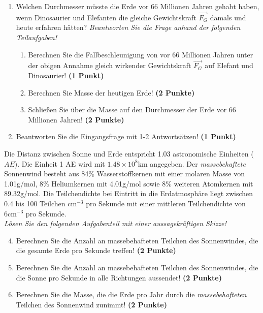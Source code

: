 \documentclass[a4paper, 9pt]{scrartcl}\usepackage[]{graphicx}\usepackage[]{xcolor}
\begin{document}
\begin{enumerate}
\item Welchen Durchmesser müsste die Erde vor 66 Millionen Jahren gehabt haben, wenn Dinosaurier und Elefanten die gleiche Gewichtskraft $\overrightarrow{F_G}$ damals und heute erfahren hätten? \textit{Beantworten Sie die Frage anhand der folgenden Teilaufgaben!}
\begin{enumerate}
\item Berechnen Sie die Fallbeschleunigung von vor 66 Millionen Jahren unter der obigen Annahme gleich wirkender Gewichtskraft $\overrightarrow{F_G}$ auf Elefant und Dinosaurier! \textbf{(1 Punkt)}
\item Berechnen Sie Masse der heutigen Erde! \textbf{(2 Punkte)}
\item Schließen Sie über die Masse auf den Durchmesser der Erde vor 66 Millionen Jahren! \textbf{(2 Punkte)}
\end{enumerate}
\item Beantworten Sie die Eingangsfrage mit 1-2 Antwortsätzen! \textbf{(1 Punkt)}
\end{enumerate}

Die Distanz zwischen Sonne und Erde entspricht 1.03 astronomische Einheiten ($AE$). Die Einheit 1 AE wird mit \ensuremath{1.48\times 10^{8}}km angegeben. Der \textit{massebehaftete} Sonnenwind besteht aus 84\% Wasserstoffkernen mit einer molaren Masse von 1.01g/mol, 8\% Heliumkernen mit 4.01g/mol sowie 8\% weiteren Atomkernen mit  89.32g/mol. Die Teilchendichte bei Eintritt in die Erdatmosphäre liegt zwischen 0.4 bis 100 Teilchen cm$^{-3}$ pro Sekunde mit einer mittleren Teilchendichte von 6cm$^{-3}$ pro Sekunde. \\

\textit{Lösen Sie den folgenden Aufgabenteil mit einer aussagekräftigen Skizze!}

\begin{enumerate}
  \setcounter{enumi}{3}
\item Berechnen Sie die Anzahl an massebehafteten Teilchen des Sonnenwindes, die die gesamte Erde pro Sekunde treffen! \textbf{(2 Punkte)}
\item Berechnen Sie die Anzahl an massebehafteten Teilchen des Sonnenwindes, die die Sonne pro Sekunde in alle Richtungen aussendet! \textbf{(2 Punkte)}
\item Berechnen Sie die Masse, die die Erde pro Jahr durch die \textit{massebehafteten} Teilchen des Sonnenwind zunimmt! \textbf{(2 Punkte)}
\end{enumerate}
\end{document}
